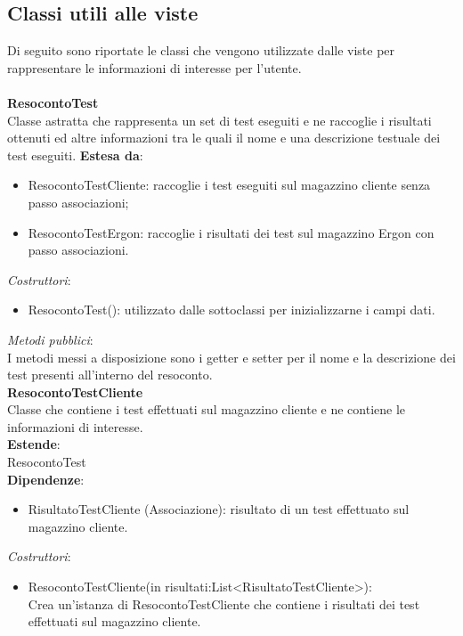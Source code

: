 \subsection{Classi utili alle viste}
Di seguito sono riportate le classi che vengono utilizzate dalle viste per rappresentare le informazioni di interesse per l'utente.
\\\\
\textbf{ResocontoTest}\\
Classe astratta che rappresenta un set di test eseguiti e ne raccoglie i risultati ottenuti ed altre informazioni tra le quali il nome e una descrizione testuale dei test eseguiti.
\textbf{Estesa da}:
\begin{itemize}
    \item ResocontoTestCliente: raccoglie i test eseguiti sul magazzino cliente senza passo associazioni;
    \item ResocontoTestErgon: raccoglie i risultati dei test sul magazzino Ergon con passo associazioni.\\
\end{itemize}
\textit{Costruttori}:\\
\begin{itemize}
    \item ResocontoTest(): utilizzato dalle sottoclassi per inizializzarne i campi dati.\\
\end{itemize}
\textit{Metodi pubblici}:\\
I metodi messi a disposizione sono i getter e setter per il nome e la descrizione dei test presenti all'interno del resoconto.\\
\textbf{ResocontoTestCliente}\\
Classe che contiene i test effettuati sul magazzino cliente e ne contiene le informazioni di interesse.\\
\textbf{Estende}:\\
ResocontoTest\\
\textbf{Dipendenze}:
\begin{itemize}
    \item RisultatoTestCliente (Associazione): risultato di un test effettuato sul magazzino cliente.\\
\end{itemize}
\textit{Costruttori}:\\
\begin{itemize}
    \item ResocontoTestCliente(in risultati:List<RisultatoTestCliente>):\\
    Crea un'istanza di ResocontoTestCliente che contiene i risultati dei test effettuati sul magazzino cliente.\\
\end{itemize}
